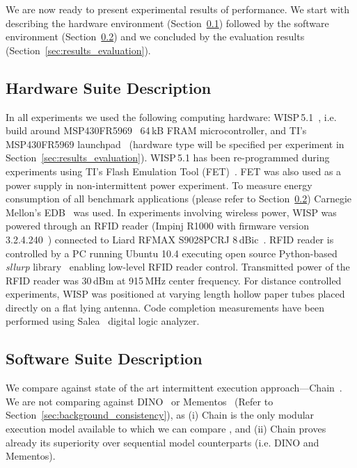 We are now ready to present experimental results of \sys performance. We start with describing the hardware environment (Section~\ref{sec:results_hardware}) followed by the software environment (Section~\ref{sec:results_software}) and we concluded by the evaluation results (Section~\ref{sec:results_evaluation}).

\subsection{Hardware Suite Description}
\label{sec:results_hardware}

In all experiments we used the following computing hardware: WISP\,5.1~\cite{wisp5,wisp}, i.e. build around MSP430FR5969~\cite{wolverine} 64\,kB FRAM microcontroller, and TI's MSP430FR5969 launchpad~\cite{MSP-EXP430FR5969_launchpad} (hardware type will be specified per experiment in Section~\ref{sec:results_evaluation}). WISP\,5.1 has been re-programmed during experiments using TI's Flash Emulation Tool (FET)~\cite{fet}. FET was also used as a power supply in non-intermittent power experiment. To measure energy consumption of all benchmark applications (please refer to Section~\ref{sec:results_software}) Carnegie Mellon's EDB~\cite{edb} was used. In experiments involving wireless power, WISP was powered through an RFID reader (Impinj R1000 with firmware version 3.2.4.240~\cite{r1000_data_sheet}) connected to Liard RFMAX S9028PCRJ 8\,dBic~\cite{atlas2015}. RFID reader is controlled by a PC running Ubuntu 10.4 executing open source Python-based \emph{sllurp} library~\cite{sllrp_github} enabling low-level RFID reader control. Transmitted power of the RFID reader was 30\,dBm at 915\,MHz center frequency. For distance controlled experiments, WISP was positioned at varying length hollow paper tubes placed directly on a flat lying antenna. Code completion measurements have been performed using Salea~\cite{saleae} digital logic analyzer.

\subsection{Software Suite Description}
\label{sec:results_software}

We compare \sys against state of the art intermittent execution approach---Chain~\cite{chain}. We are not comparing \sys against DINO~\cite{dino} or Mementos~\cite{mementos} (Refer to Section~\ref{sec:background_consistency}), as (i) Chain is the only modular execution model available to which we can compare \sys, and (ii) Chain proves already its superiority over sequential model counterparts (i.e. DINO and Mementos).

